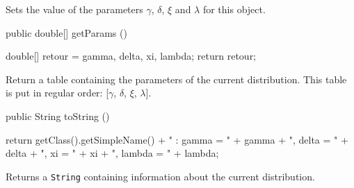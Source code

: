   \begin{tabb}
  Sets the value of the parameters $\gamma$, $\delta$, $\xi$ and
  $\lambda$ for this object.
 \end{tabb}
\begin{code}

   public double[] getParams ()\begin{hide} {
      double[] retour = {gamma, delta, xi, lambda};
      return retour;
   }\end{hide}
\end{code}
\begin{tabb}
   Return a table containing the parameters of the current distribution.
   This table is put in regular order: [$\gamma$, $\delta$, $\xi$, $\lambda$].
\end{tabb}
\begin{hide}\begin{code}

   public String toString ()\begin{hide} {
      return getClass().getSimpleName() + " : gamma = " + gamma + ", delta = " + delta + ", xi = " + xi + ", lambda = " + lambda;
   }\end{hide}
\end{code}
\begin{tabb}
   Returns a \texttt{String} containing information about the current distribution.
\end{tabb}\end{hide}
\begin{code}\begin{hide}
}\end{hide}
\end{code}
